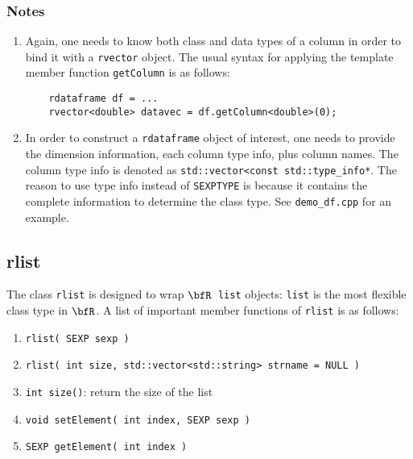 \documentclass{article}
\newcommand{\R}{$\bfR$}
\begin{document}
\subsubsection*{Notes}
\begin{enumerate}
  \item Again, one needs to know both class and data types of
    a column in order to bind it with a \texttt{rvector}
    object. The usual syntax for applying the template member
    function \texttt{getColumn} is as follows:
    \begin{lstlisting}
    rdataframe df = ...
    rvector<double> datavec = df.getColumn<double>(0);
    \end{lstlisting}
  \item In order to construct a \texttt{rdataframe} object of
    interest, one needs to provide the dimension information,
    each column type info, plus column names. The column type
    info is denoted as \texttt{std::vector<const
    std::type\_info*}. The reason to use type info instead of
    \texttt{SEXPTYPE} is because it contains the complete information
    to determine the class type. See \texttt{demo\_df.cpp}
    for an example.
\end{enumerate}

\subsection{rlist}

The class \texttt{rlist} is designed to wrap \R\
\texttt{list} objects: \texttt{list} is the most flexible
class type in \R. A list of important member functions of
\texttt{rlist} is as follows:
\begin{enumerate}
  \item \texttt{rlist( SEXP sexp )}
  \item \texttt{rlist( int size, std::vector<std::string>
    strname = NULL )}
  \item \texttt{int size()}: return the size of the list
  \item \texttt{void setElement( int index, SEXP sexp )}
  \item \texttt{SEXP getElement( int  index )}
\end{enumerate}
\end{document}
